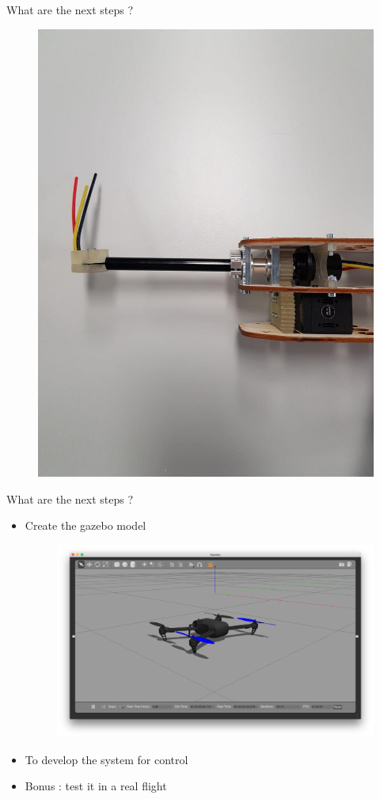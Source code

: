 \documentclass{beamer}
\begin{document}
\begin{frame}{What are the next steps ?}
\begin{itemize}
\begin{figure}
\includegraphics[scale=0.3]{pictures/build3}
\end{figure}
\end{itemize}
\end{frame}

\begin{frame}{What are the next steps ?}
\begin{itemize}
\item Create the gazebo model
\begin{figure}
\includegraphics[scale=0.1]{pictures/gazebo}
\end{figure}
\item To develop the system for control
\item Bonus : test it in a real flight
\end{itemize}
\end{frame}
\end{document}
